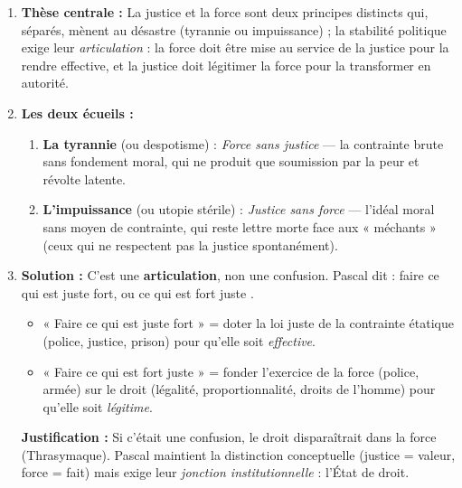 \documentclass[11pt]{article}
\begin{document}
\begin{corrige}
\begin{enumerate}
    \item \textbf{Thèse centrale :} La justice et la force sont deux principes distincts qui, séparés, mènent au désastre (tyrannie ou impuissance) ; la stabilité politique exige leur \emph{articulation} : la force doit être mise au service de la justice pour la rendre effective, et la justice doit légitimer la force pour la transformer en autorité.
    \item \textbf{Les deux écueils :}
    \begin{enumerate}
        \item \textbf{La tyrannie} (ou despotisme) : \emph{Force sans justice} — la contrainte brute sans fondement moral, qui ne produit que soumission par la peur et révolte latente.
        \item \textbf{L'impuissance} (ou utopie stérile) : \emph{Justice sans force} — l'idéal moral sans moyen de contrainte, qui reste lettre morte face aux « méchants » (ceux qui ne respectent pas la justice spontanément).
    \end{enumerate}
    \item \textbf{Solution :} C'est une \textbf{articulation}, non une confusion. Pascal dit : \guillemotleft faire ce qui est juste fort, ou ce qui est fort juste \guillemotright.
    \begin{itemize}
        \item « Faire ce qui est juste fort » = doter la loi juste de la contrainte étatique (police, justice, prison) pour qu'elle soit \emph{effective}.
        \item « Faire ce qui est fort juste » = fonder l'exercice de la force (police, armée) sur le droit (légalité, proportionnalité, droits de l'homme) pour qu'elle soit \emph{légitime}.
    \end{itemize}
    \textbf{Justification :} Si c'était une confusion, le droit disparaîtrait dans la force (Thrasymaque). Pascal maintient la distinction conceptuelle (justice = valeur, force = fait) mais exige leur \emph{jonction institutionnelle} : l'État de droit.
\end{enumerate}
\end{corrige}
\end{document}
